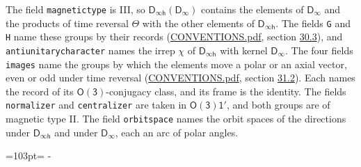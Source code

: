 \documentclass[10pt,a4paper]{article}
\newcommand{\needspace}[1]{\par\penalty-100\begingroup\dimen0=#1\relax\dimen2=\pagegoal
  \advance\dimen2-\pagetotal\ifdim\dimen0>\dimen2\relax\ifdim\dimen2>0pt\vfil\break\fi\fi
  \endgroup}
\numberwithin{equation}{section}
\newcommand{\grp}[1]{\mathsf{#1}}
\begin{document}
The field \texttt{magnetictype} is III, so $\grp{D_{\infty h}}(\grp{D_{\infty}})$ contains the elements of $\grp{D_{\infty}}$ and the products of time reversal $\varTheta$ with the other elements of $\grp{D_{\infty h}}$. The fields \texttt{G} and \texttt{H} name these groups by their records (\href{../../CONVENTIONS.pdf}{CONVENTIONS.pdf}, section \href{../../CONVENTIONS.pdf\#conv.30.3}{30.3}), and \texttt{antiunitarycharacter} names the irrep $\chi$ of $\grp{D_{\infty h}}$ with kernel $\grp{D_{\infty}}$. The four fields \texttt{images} name the groups by which the elements move a polar or an axial vector, even or odd under time reversal (\href{../../CONVENTIONS.pdf}{CONVENTIONS.pdf}, section \href{../../CONVENTIONS.pdf\#conv.31.2}{31.2}). Each names the record of its $\grp{O(3)}$-conjugacy class, and its frame is the identity. The fields \texttt{normalizer} and \texttt{centralizer} are taken in $\grp{O(3)1'}$, and both groups are of magnetic type II. The field \texttt{orbitspace} names the orbit spaces of the directions under $\grp{D_{\infty h}}$ and under $\grp{D_{\infty}}$, each an arc of polar angles.
\needspace{103pt}
\end{document}
